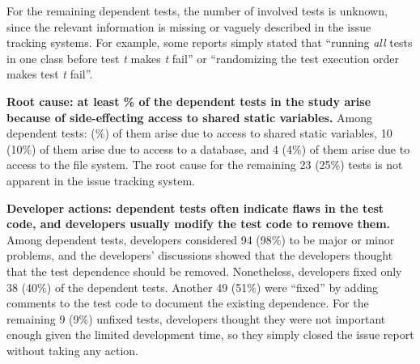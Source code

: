 For the remaining \unum dependent tests, the number of involved tests
is unknown, since the relevant information is missing
or vaguely described in the issue tracking systems. For example,
some reports simply stated that ``running \textit{all} tests in one class before
test \emph{t} makes \emph{t} fail'' or ``randomizing the test execution order
makes test \emph{t} fail''.






\tinyrelax
\noindent \textbf{{Root cause: at least \svratio\% of the dependent tests
in the study arise because of side-effecting access to shared static
variables.}} Among \dtnum dependent tests:
\svnum (\svratio\%) of them
arise due to access to
shared static variables,
10 (10\%) of them arise
due to access to a database, and
4 (4\%) of them arise
due to access to the file system.
The root cause for the remaining 23 (25\%) tests is not apparent
in the issue tracking system.

\tinyrelax
\noindent \textbf{{Developer actions: dependent tests
often indicate flaws in the test code, and developers usually
modify the test code to remove them.}}
Among \dtnum dependent tests, developers considered 
94 (98\%) to be major or minor problems, and the 
developers' discussions showed that the developers thought that the test
dependence should be removed.
Nonetheless, developers fixed only 38 (40\%) of the \dtnum dependent tests.
Another 49 (51\%) were ``fixed'' 
by adding comments to the test code to document the existing dependence.
For the remaining 9 (9\%) unfixed tests,
developers thought they were not important enough given the limited
development time, so they simply closed the issue report without taking
any action.

